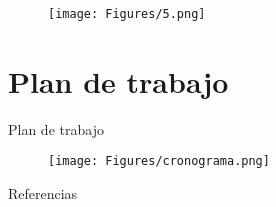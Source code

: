 \documentclass[10pt,aspectratio=169]{beamer}
\begin{document}
\begin{frame}
  \begin{figure}[H] 
      \centering 
      \texttt{[image: Figures/5.png]} 
  \end{figure} 
\end{frame}











\section{Plan de trabajo}

\begin{frame}{Plan de trabajo}
  
  \begin{figure}[H] 
      \centering 
      \texttt{[image: Figures/cronograma.png]} 
  \end{figure} 
\end{frame}



\begin{frame}{Referencias}

  
  

\end{frame}




  
\end{document}
